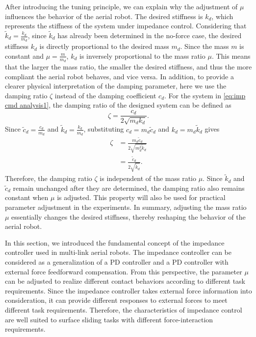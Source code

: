 After introducing the tuning principle, we can explain why the adjustment of $\mu$ influences the behavior of the aerial robot. The desired stiffness is $k_d$, which represents the stiffness of the system under impedance control. Considering that $\tilde{k}_d = \frac{k_d}{m_d}$, since $\tilde{k}_d$ has already been determined in the no-force case, the desired stiffness $k_d$ is directly proportional to the desired mass $m_d$. Since the mass $m$ is constant and $\mu=\frac{m}{m_d}$, $k_d$ is inversely proportional to the mass ratio $\mu$. This means that the larger the mass ratio, the smaller the desired stiffness, and thus the more compliant the aerial robot behaves, and vice versa. In addition, to provide a clearer physical interpretation of the damping parameter, here we use the damping ratio $\zeta$ instead of the damping coefficient $c_d$. For the system in \eqref{eq:imp cmd analysis1}, the damping ratio of the designed system can be defined as
\begin{equation}
\label{eq:damping ratio 1}
\zeta=\frac{c_d}{2\sqrt{m_dk_d}}.
\end{equation}
Since $\tilde{c}_d = \frac{c_d}{m_d}$ and $\tilde{k}_d = \frac{k_d}{m_d}$, substituting $c_d=m_d\tilde{c}_d$ and $k_d=m_d\tilde{k}_d$ gives
\begin{equation}
\label{eq:damping ratio 2}
\begin{aligned}
\zeta
&=\frac{m_d\tilde{c}_d}{2\sqrt{m_d^2\tilde{k}_d}}\\
&=\frac{\tilde{c}_d}{2\sqrt{\tilde{k}_d}}.
\end{aligned}
\end{equation}
Therefore, the damping ratio $\zeta$ is independent of the mass ratio $\mu$. Since $\tilde{k}_d$ and $\tilde{c}_d$ remain unchanged after they are determined, the damping ratio also remains constant when $\mu$ is adjusted. This property will also be used for practical parameter adjustment in the experiments. In summary, adjusting the mass ratio $\mu$ essentially changes the desired stiffness, thereby reshaping the behavior of the aerial robot.

In this section, we introduced the fundamental concept of the impedance controller used in multi-link aerial robots. The impedance controller can be considered as a generalization of a PD controller and a PD controller with external force feedforward compensation. From this perspective, the parameter $\mu$ can be adjusted to realize different contact behaviors according to different task requirements. Since the impedance controller takes external force information into consideration, it can provide different responses to external forces to meet different task requirements. Therefore, the characteristics of impedance control are well suited to surface sliding tasks with different force-interaction requirements.

